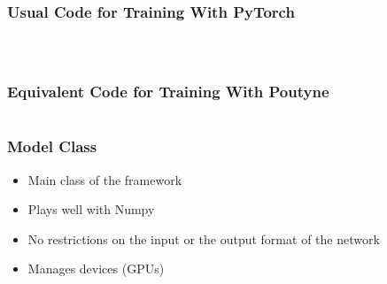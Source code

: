 \documentclass[french,english,usenames,dvipsnames]{beamer}
\begin{document}
    \begin{frame}
        \frametitle{Usual Code for Training With PyTorch}

        \begin{columns}
			\begin{column}{0.45\textwidth}
				\centering
                \inputminted[fontsize=\fontsize{1.25mm}{1.5mm}]{python3}{code/long_pytorch_part1.py}
			\end{column}
			\begin{column}{0.55\textwidth}
                \centering
                \inputminted[fontsize=\fontsize{1.25mm}{1.5mm}]{python3}{code/long_pytorch_part2.py}
			\end{column}
        \end{columns}
    \end{frame}

    \begin{frame}
        \frametitle{Equivalent Code for Training With Poutyne}
        \begin{center}
            \inputminted[fontsize=\scriptsize]{python3}{code/long_pytorch_to_poutyne_shorten.py}
        \end{center}
    \end{frame}



    \begin{frame}[fragile]
        \frametitle{Model Class}
        \begin{itemize}
            \item Main class of the framework
            \item Plays well with Numpy
            \item No restrictions on the input or the output format of the network
            \item Manages devices (GPUs)\\[5mm]
            \inputminted[fontsize=\scriptsize]{python3}{code/example_model.py}
        \end{itemize}
    \end{frame}


\end{document}
